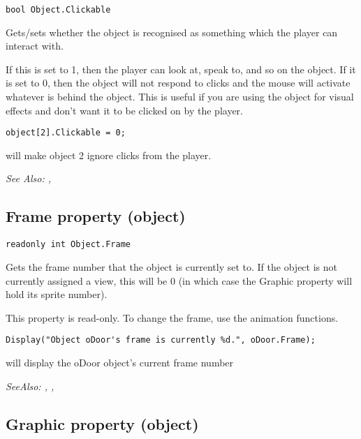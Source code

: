 \begin{verbatim}
bool Object.Clickable
\end{verbatim}
Gets/sets whether the object is recognised as something which the player can
interact with.

If this is set to 1, then the player can look at, speak to, and so on the
object. If it is set to 0, then the object will not respond to clicks and
the mouse will activate whatever is behind the object.
This is useful if you are using the object for visual effects and don't
want it to be clicked on by the player.

\begin{verbatim}
object[2].Clickable = 0;
\end{verbatim}
will make object 2 ignore clicks from the player.

\it{See Also:} ,


\subsection{Frame property (object)}\label{Object.Frame}%

\begin{verbatim}
readonly int Object.Frame
\end{verbatim}
Gets the frame number that the object is currently set to. If the object is not currently
assigned a view, this will be 0 (in which case the Graphic property will
hold its sprite number).

This property is read-only. To change the frame, use the animation functions.

\begin{verbatim}
Display("Object oDoor's frame is currently %d.", oDoor.Frame);
\end{verbatim}
will display the oDoor object's current frame number

\it{SeeAlso:} ,
,


\subsection{Graphic property (object)}\label{Object.Graphic}%

